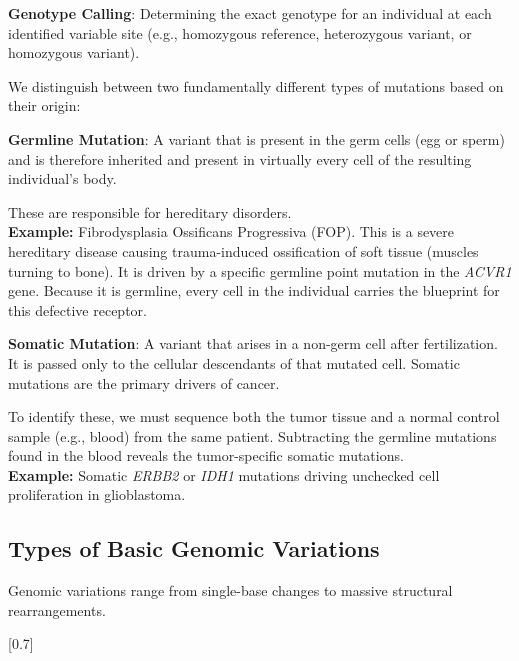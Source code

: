 \begin{important}
  \textbf{Genotype Calling}: Determining the exact genotype for an individual at each identified variable site (e.g., homozygous reference, heterozygous variant, or homozygous variant).
\end{important}

We distinguish between two fundamentally different types of mutations based on their origin:

\begin{important}
  \textbf{Germline Mutation}: A variant that is present in the germ cells (egg or sperm) and is therefore inherited and present in virtually every cell of the resulting individual's body.
\end{important}
\sta These are responsible for hereditary disorders. \\
\textbf{Example:} Fibrodysplasia Ossificans Progressiva (FOP). This is a severe hereditary disease causing trauma-induced ossification of soft tissue (muscles turning to bone). It is driven by a specific germline point mutation in the \textit{ACVR1} gene. Because it is germline, every cell in the individual carries the blueprint for this defective receptor.

\begin{important}
  \textbf{Somatic Mutation}: A variant that arises in a non-germ cell after fertilization. It is passed only to the cellular descendants of that mutated cell. Somatic mutations are the primary drivers of cancer.
\end{important}
\sta To identify these, we must sequence both the tumor tissue and a normal control sample (e.g., blood) from the same patient. Subtracting the germline mutations found in the blood reveals the tumor-specific somatic mutations. \\
\textbf{Example:} Somatic \textit{ERBB2} or \textit{IDH1} mutations driving unchecked cell proliferation in glioblastoma.

\subsection{Types of Basic Genomic Variations}

Genomic variations range from single-base changes to massive structural rearrangements.


[0.7]


